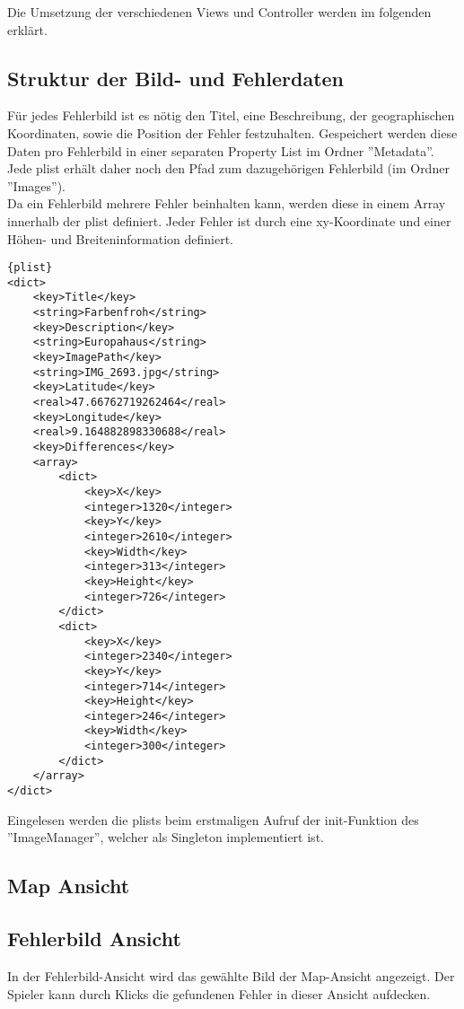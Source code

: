 Die Umsetzung der verschiedenen Views und Controller werden im folgenden erklärt.

\subsection{Struktur der Bild- und Fehlerdaten}
Für jedes Fehlerbild ist es nötig den Titel, eine Beschreibung, der geographischen Koordinaten, sowie die Position der Fehler festzuhalten. Gespeichert werden diese
Daten pro Fehlerbild in einer separaten Property List im Ordner ''Metadata''. Jede plist erhält daher noch den Pfad zum dazugehörigen Fehlerbild (im Ordner ''Images'').\\
Da ein Fehlerbild mehrere Fehler beinhalten kann, werden diese in einem Array innerhalb
der plist definiert. Jeder Fehler ist durch eine xy-Koordinate und einer Höhen- und Breiteninformation definiert.

\begin{lstlisting}[caption=Ausschnitt aus einer plist]{plist}
<dict>
	<key>Title</key>
	<string>Farbenfroh</string>
	<key>Description</key>
	<string>Europahaus</string>
	<key>ImagePath</key>
	<string>IMG_2693.jpg</string>
	<key>Latitude</key>
	<real>47.66762719262464</real>
	<key>Longitude</key>
	<real>9.164882898330688</real>
	<key>Differences</key>
	<array>
		<dict>
			<key>X</key>
			<integer>1320</integer>
			<key>Y</key>
			<integer>2610</integer>
			<key>Width</key>
			<integer>313</integer>
			<key>Height</key>
			<integer>726</integer>
		</dict>
		<dict>
			<key>X</key>
			<integer>2340</integer>
			<key>Y</key>
			<integer>714</integer>
			<key>Height</key>
			<integer>246</integer>
			<key>Width</key>
			<integer>300</integer>
		</dict>
	</array>
</dict>
\end{lstlisting}

Eingelesen werden die plists beim erstmaligen Aufruf der init-Funktion des ''ImageManager'', welcher als Singleton implementiert ist. 

\subsection{Map Ansicht}

\subsection{Fehlerbild Ansicht} 
In der Fehlerbild-Ansicht wird das gewählte Bild der Map-Ansicht angezeigt. Der Spieler kann durch Klicks die gefundenen Fehler in dieser Ansicht aufdecken.
